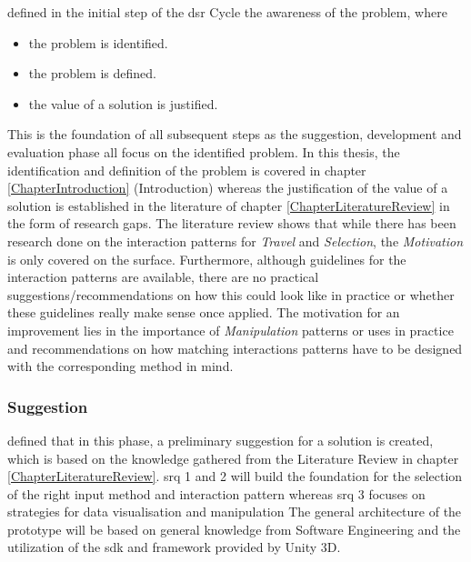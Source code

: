 \cite{Hevner2010} defined in the initial step of the \gls{dsr} Cycle the awareness of the problem, where
\begin{itemize}[noitemsep,nolistsep]
	\item the problem is identified.
	\item the problem is defined.
	\item the value of a solution is justified.
\end{itemize}
This is the foundation of all subsequent steps as the suggestion, development and evaluation phase all focus on the identified problem. \newline
In this thesis, the identification and definition of the problem is covered in chapter \ref{ChapterIntroduction} (Introduction) whereas the justification of the value of a solution is established in the literature of chapter \ref{ChapterLiteratureReview} in the form of research gaps.
The literature review shows that while there has been research done on the interaction patterns for \textit{Travel} and \textit{Selection}, the \textit{Motivation} is only covered on the surface. Furthermore, although guidelines for the interaction patterns are available, there are no practical suggestions/recommendations on how this could look like in practice or whether these guidelines really make sense once applied. The motivation for an improvement lies in the importance of \textit{Manipulation} patterns or uses in practice and recommendations on how matching interactions patterns have to be designed with the corresponding method in mind.



\subsubsection{Suggestion}

\cite{Hevner2010} defined that in this phase, a preliminary suggestion for a solution is created, which is based on the knowledge gathered from the Literature Review in chapter \ref{ChapterLiteratureReview}. \gls{srq} 1 and 2 will build the foundation for the selection of the right input method and interaction pattern whereas \gls{srq} 3 focuses on strategies for data visualisation and manipulation \newline
The general architecture of the prototype will be based on general knowledge from Software Engineering and the utilization of the \gls{sdk} and framework provided by Unity 3D.



